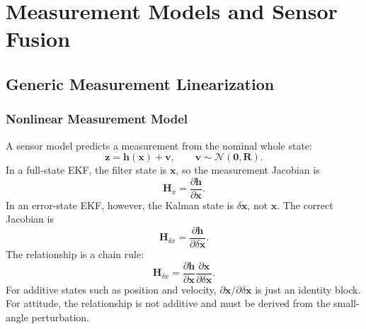 \documentclass[11pt,oneside]{book}
\newcommand{\xb}{\mathbf{x}}
\newcommand{\zero}{\mathbf{0}}
\begin{document}
\chapter{Measurement Models and Sensor Fusion}

\section{Generic Measurement Linearization}
\subsection{Nonlinear Measurement Model}
A sensor model predicts a measurement from the nominal whole state:
\begin{equation}
\mathbf{z}=\mathbf{h}(\xb)+\mathbf{v},
\qquad
\mathbf{v}\sim\mathcal{N}(\zero,\mathbf{R}).
\end{equation}
In a full-state EKF, the filter state is $\xb$, so the measurement Jacobian is
\begin{equation}
\mathbf{H}_x=\frac{\partial\mathbf{h}}{\partial\xb}.
\end{equation}
In an error-state EKF, however, the Kalman state is $\delta\xb$, not $\xb$. The correct Jacobian is
\begin{equation}
\mathbf{H}_{\delta x}=\frac{\partial\mathbf{h}}{\partial\delta\xb}.
\label{eq:error_state_h_def_rev2}
\end{equation}
The relationship is a chain rule:
\begin{equation}
\mathbf{H}_{\delta x}
=
\frac{\partial\mathbf{h}}{\partial\xb}
\frac{\partial\xb}{\partial\delta\xb}.
\label{eq:h_chain_rule_rev2}
\end{equation}
For additive states such as position and velocity, $\partial\xb/\partial\delta\xb$ is just an identity block. For attitude, the relationship is not additive and must be derived from the small-angle perturbation.
\end{document}
